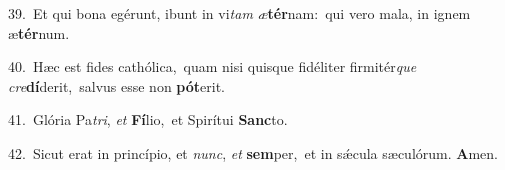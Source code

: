 {\numbfont\textcolor{\numbcolor}{39.}}~Et qui bona egérunt, ibunt in vi\textit{tam} \textit{æ}\-\textbf{tér}nam:~\star qui vero mala, in ignem æ\-\textbf{tér}\-num.\par
{\numbfont\textcolor{\numbcolor}{40.}}~Hæc est fides cathólica,~\dagger quam nisi quisque fidéliter firmitér\textit{que} \textit{cre}\-\textbf{dí}derit,~\star salvus esse non \textbf{pót}\-erit.\par
{\numbfont\textcolor{\numbcolor}{41.}}~Glória Pa\-\textit{tri}\-, \textit{et} \textbf{Fí}\-lio,~\star et Spirítui \textbf{Sanc}\-to.\par
{\numbfont\textcolor{\numbcolor}{42.}}~Sicut erat in princípio, et \textit{nunc}\-, \textit{et} \textbf{sem}\-per,~\star et in sǽcula sæculórum. \textbf{A}\-men.\par
